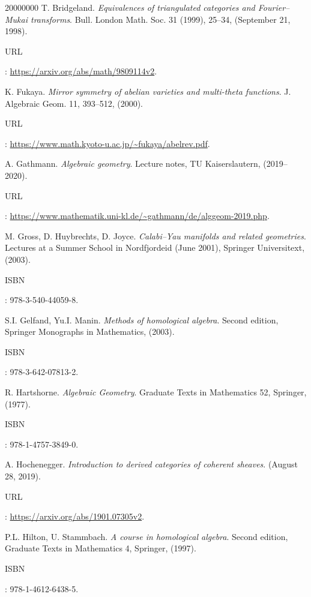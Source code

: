 \begin{thebibliography}{20000000}
\bibitem[Bri98]{[Bri98]} T. Bridgeland. \textit{Equivalences of triangulated categories and Fourier--Mukai
	transforms}. Bull. London Math. Soc. 31 (1999), 25--34, (September 21, 1998).
\begin{footnotesize}URL\end{footnotesize}: \url{https://arxiv.org/abs/math/9809114v2}.

\bibitem[Fuk00]{[Fuk00]} K. Fukaya. \textit{Mirror symmetry of abelian varieties and multi-theta functions}. J. Algebraic Geom. 11, 393--512, (2000). \begin{footnotesize}URL\end{footnotesize}: \url{https://www.math.kyoto-u.ac.jp/~fukaya/abelrev.pdf}.

\bibitem[Gat20]{[Gat20]} A. Gathmann. \textit{Algebraic geometry}. Lecture notes, TU Kaiserslautern, (2019--2020). \begin{footnotesize}URL\end{footnotesize}: \url{https://www.mathematik.uni-kl.de/~gathmann/de/alggeom-2019.php}.

\bibitem[GHJ03]{[GHJ03]} M. Gross, D. Huybrechts, D. Joyce. \textit{Calabi--Yau manifolds and related geometries}. Lectures at a Summer School in Nordfjordeid (June 2001), Springer Universitext, (2003). \begin{footnotesize}ISBN\end{footnotesize}: 978-3-540-44059-8.

\bibitem[GM03]{[GM03]} S.I. Gelfand, Yu.I. Manin. \textit{Methods of homological algebra}. Second edition, Springer Monographs in Mathematics, (2003). \begin{footnotesize}ISBN\end{footnotesize}: 978-3-642-07813-2.

\bibitem[Har77]{[Har77]} R. Hartshorne. \textit{Algebraic Geometry}. Graduate Texts in Mathematics 52, Springer, (1977). \begin{footnotesize}ISBN\end{footnotesize}: 978-1-4757-3849-0.

\bibitem[Hoc19]{[Hoc19]} A. Hochenegger. \textit{Introduction to derived categories of coherent sheaves}. (August 28, 2019). \begin{footnotesize}URL\end{footnotesize}: \url{https://arxiv.org/abs/1901.07305v2}.

\bibitem[HS97]{[HS97]} P.L. Hilton, U. Stammbach. \textit{A course in homological algebra}. Second edition, Graduate Texts in Mathematics 4, Springer, (1997). \begin{footnotesize}ISBN\end{footnotesize}: 978-1-4612-6438-5.


\end{thebibliography}
